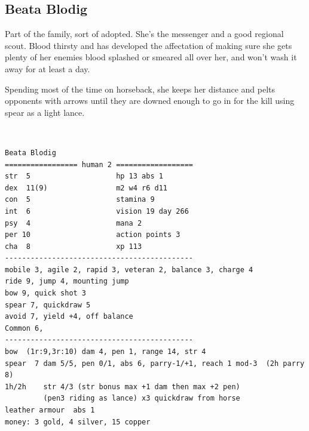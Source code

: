 \clearpage
\begin{samepage}
\subsection*{Beata Blodig}
Part of the family, sort of adopted. She's the messenger and a good regional scout. Blood thirsty and has developed the affectation of making sure she gets plenty of her enemies blood splashed or smeared all over her, and won't wash it away for at least a day.

Spending most of the time on horseback, she keeps her distance and pelts opponents with arrows until they are downed enough to go in for the kill using spear as a light lance.

\

\small \begin{verbatim}
Beata Blodig
================= human 2 ==================
str  5                    hp 13 abs 1
dex  11(9)                m2 w4 r6 d11
con  5                    stamina 9
int  6                    vision 19 day 266
psy  4                    mana 2
per 10                    action points 3
cha  8                    xp 113
--------------------------------------------
mobile 3, agile 2, rapid 3, veteran 2, balance 3, charge 4
ride 9, jump 4, mounting jump
bow 9, quick shot 3
spear 7, quickdraw 5
avoid 7, yield +4, off balance
Common 6,
--------------------------------------------
bow  (1r:9,3r:10) dam 4, pen 1, range 14, str 4
spear  7 dam 5/5, pen 0/1, abs 6, parry-1/+1, reach 1 mod-3  (2h parry 8)
1h/2h    str 4/3 (str bonus max +1 dam then max +2 pen)
         (pen3 riding as lance) x3 quickdraw from horse
leather armour  abs 1
money: 3 gold, 4 silver, 15 copper
\end{verbatim} \normalsize
\end{samepage}



